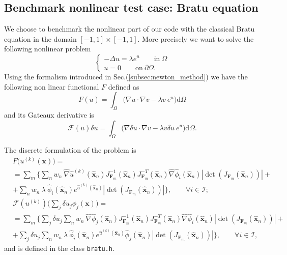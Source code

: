 \subsection{Benchmark nonlinear test case: Bratu equation}
We choose to benchmark the nonlinear part of our code with the classical Bratu equation in the domain $[-1,1]\times[-1,1]$. More precisely we want to solve the following nonlinear problem
\begin{equation}
  \begin{cases}
   -\Delta u=\lambda e^{u}\qquad\mathrm{in}\:\Omega\\
   u=0\qquad\mathrm{on}\:\partial\Omega.
  \end{cases}
\end{equation}
Using the formalism introduced in Sec.(\ref{subsec:newton_method}) we have the following non linear functional $F$ defined as
\begin{equation}
  F(u)=\int_\Omega \big(\nabla u \cdot\nabla v-\lambda v\:e^{u}\big)\mathrm{d}\Omega
\end{equation}
and its Gateaux derivative is
\begin{equation}
  \mathcal{F}(u)\delta u=\int_\Omega \big(\nabla\delta u \cdot\nabla v-\lambda v\delta u\:e^{u}\big)\mathrm{d}\Omega.
\end{equation}

The discrete formulation of the problem is
\begin{equation}
  \begin{split}
    &F\big(u^{(k)}(\mathbf{x})\big)=\\
    &=\sum_m \bigg\{\sum_n w_n\:\hat{\nabla}\hat{u}^{(k)}(\mathbf{\hat{x}}_n)J_{\mathbf{F}_m}^{-1}(\mathbf{\hat{x}}_n)J_{\mathbf{F}_m}^{-T}(\mathbf{\hat{x}}_n)\hat{\nabla}\hat{\phi}_i(\mathbf{\hat{x}}_n)|\det(J_{\mathbf{F}_m}(\mathbf{\hat{x}}_n))|+\\
    &+\sum_n w_n\:\lambda\:\hat{\phi}_i(\mathbf{\hat{x}}_n)e^{\hat{u}^{(k)}(\mathbf{\hat{x}}_n)}|\det(J_{\mathbf{F}_m}(\mathbf{\hat{x}}_n))|\bigg\},\qquad\forall i\in\mathcal{I};
  \end{split}
\end{equation}
\begin{equation}
  \begin{split}
    &\mathcal{F}(u^{(k)})\bigg(\sum_j\delta u_j\phi_j(\mathbf{x})\bigg)=\\
    &=\sum_m \bigg\{\sum_j \delta u_j \sum_n w_n\:\hat{\nabla}\hat{\phi}_j(\mathbf{\hat{x}}_n)J_{\mathbf{F}_m}^{-1}(\mathbf{\hat{x}}_n)J_{\mathbf{F}_m}^{-T}(\mathbf{\hat{x}}_n)\hat{\nabla}\hat{\phi}_i(\mathbf{\hat{x}}_n)|\det(J_{\mathbf{F}_m}(\mathbf{\hat{x}}_n))|+\\
    &+\sum_j \delta u_j \sum_n w_n\:\lambda\:\hat{\phi}_i(\mathbf{\hat{x}}_n)e^{\hat{u}^{(k)}(\mathbf{\hat{x}}_n)}\hat{\phi}_j(\mathbf{\hat{x}}_n)|\det(J_{\mathbf{F}_m}(\mathbf{\hat{x}}_n))|\bigg\},\qquad\forall i\in\mathcal{I},
  \end{split}
\end{equation}
and is defined in the class \verb|bratu.h|.
\medskip

